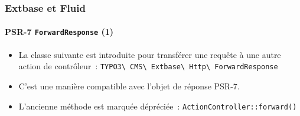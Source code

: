 %

\begin{frame}[fragile]
	\frametitle{Extbase et Fluid}
	\framesubtitle{PSR-7 \texttt{ForwardResponse} (1)}

	\begin{itemize}
		\item La classe suivante est introduite pour transférer une requête à
			une autre action de contrôleur~:
			\smaller\texttt{TYPO3\textbackslash
				CMS\textbackslash
				Extbase\textbackslash
				Http\textbackslash
				ForwardResponse}\normalsize
		\item C'est une manière compatible avec l'objet de réponse PSR-7.
		\item L'ancienne méthode est marquée dépréciée~:\newline
			\smaller\texttt{ActionController::forward()}\normalsize

	\end{itemize}

\end{frame}

